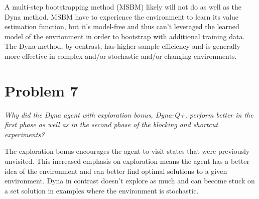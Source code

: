 \documentclass{article}
\begin{document}
A multi-step bootstrapping method (MSBM) likely will not do as well as the Dyna method. MSBM have to experience the environment to learn its value estimation function, but it's model-free and thus can't leveraged the learned model of the envrionment in order to bootstrap with additional training data. The Dyna method, by ocntrast, has higher sample-efficiency and is generally more effective in complex and/or stochastic and/or changing environments.

\section*{Problem 7}

\textit{Why did the Dyna agent with exploration bonus, Dyna-Q+, perform better in the first phase as well as in the second phase of the blocking and shortcut experiments?}

The exploration bonus encourages the agent to visit states that were previously unvisited. This increased emphasis on exploration means the agent has a better idea of the environment and can better find optimal solutions to a given environment. Dyna in contrast doesn't explore as much and can become stuck on a set solution in examples where the environment is stochastic.
\end{document}
